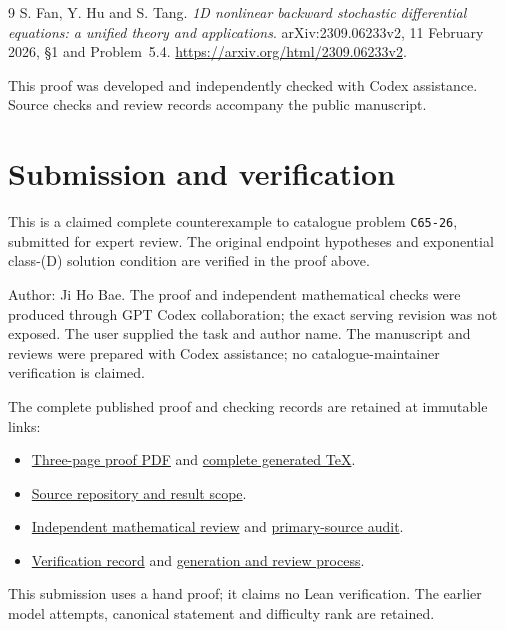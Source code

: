 \documentclass[11pt]{article}
\begin{document}
\begin{thebibliography}{9}
 S. Fan, Y. Hu and S. Tang.
\emph{1D nonlinear backward stochastic differential equations: a unified theory and applications}.
arXiv:2309.06233v2, 11 February 2026, \S1 and Problem~5.4.
\url{https://arxiv.org/html/2309.06233v2}.
\end{thebibliography}

\smallskip\noindent\footnotesize
This proof was developed and independently checked with Codex assistance. Source checks and review records accompany the public manuscript.

\normalsize
\section*{Submission and verification}
This is a claimed complete counterexample to catalogue problem \texttt{C65-26}, submitted for expert review. The original endpoint hypotheses and exponential class-(D) solution condition are verified in the proof above.

Author: Ji Ho Bae. The proof and independent mathematical checks were produced through GPT Codex collaboration; the exact serving revision was not exposed. The user supplied the task and author name. The manuscript and reviews were prepared with Codex assistance; no catalogue-maintainer verification is claimed.

The complete published proof and checking records are retained at immutable links:
\begin{itemize}
\item \href{https://github.com/jbaelaw/convex-bsde-endpoint-nonuniqueness/blob/37c5527739490fa7e9eed60159b8b6d53249cf5b/paper/Proof.pdf}{Three-page proof PDF} and \href{https://github.com/jbaelaw/convex-bsde-endpoint-nonuniqueness/blob/37c5527739490fa7e9eed60159b8b6d53249cf5b/paper/Proof.tex}{complete generated TeX}.
\item \href{https://github.com/jbaelaw/convex-bsde-endpoint-nonuniqueness/blob/37c5527739490fa7e9eed60159b8b6d53249cf5b/README.md}{Source repository and result scope}.
\item \href{https://github.com/jbaelaw/convex-bsde-endpoint-nonuniqueness/blob/37c5527739490fa7e9eed60159b8b6d53249cf5b/verification/MathematicalReview.md}{Independent mathematical review} and \href{https://github.com/jbaelaw/convex-bsde-endpoint-nonuniqueness/blob/37c5527739490fa7e9eed60159b8b6d53249cf5b/verification/SourceAudit.md}{primary-source audit}.
\item \href{https://github.com/jbaelaw/convex-bsde-endpoint-nonuniqueness/blob/37c5527739490fa7e9eed60159b8b6d53249cf5b/verification/Verification.json}{Verification record} and \href{https://github.com/jbaelaw/convex-bsde-endpoint-nonuniqueness/blob/37c5527739490fa7e9eed60159b8b6d53249cf5b/provenance/Process.md}{generation and review process}.
\end{itemize}
This submission uses a hand proof; it claims no Lean verification. The earlier model attempts, canonical statement and difficulty rank are retained.
\end{document}
